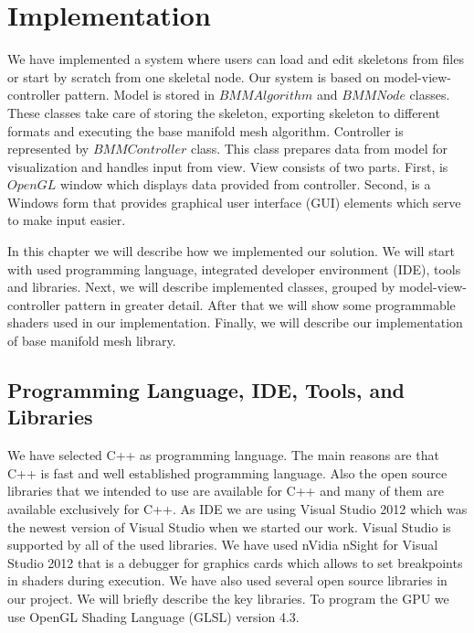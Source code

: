 \chapter{Implementation}

We have implemented a system where users can load and edit skeletons from files or start by scratch from one skeletal node.
Our system is based on model-view-controller pattern.
Model is stored in $BMMAlgorithm$ and $BMMNode$ classes.
These classes take care of storing the skeleton, exporting skeleton to different formats and executing the base manifold mesh algorithm.
Controller is represented by $BMMController$ class.
This class prepares data from model for visualization and handles input from view.
View consists of two parts.
First, is $OpenGL$ window which displays data provided from controller.
Second, is a Windows form that provides graphical user interface (GUI) elements which serve to make input easier.

In this chapter we will describe how we implemented our solution.
We will start with used programming language, integrated developer environment (IDE), tools and libraries.
Next, we will describe implemented classes, grouped by model-view-controller pattern in greater detail.
After that we will show some programmable shaders used in our implementation.
Finally, we will describe our implementation of base manifold mesh library.

\section{Programming Language, IDE, Tools, and Libraries}

We have selected C++ as programming language.
The main reasons are that C++ is fast and well established programming language.
Also the open source libraries that we intended to use are available for C++ and many of them are available exclusively for C++.
As IDE we are using Visual Studio 2012 which was the newest version of Visual Studio when we started our work.
Visual Studio is supported by all of the used libraries.
We have used nVidia nSight for Visual Studio 2012 that is a debugger for graphics cards which allows to set breakpoints in shaders during execution. We have also used several open source libraries in our project. We will briefly describe the key libraries.
To program the GPU we use OpenGL Shading Language (GLSL) version 4.3.

